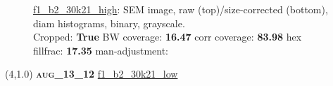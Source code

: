 \begin{figure}[h!]
\label{semimg14}
\caption*{\hyperlink{covtableaug_13_12}{\color{blue} \small \ttfamily f1\_b2\_30k21\_high}: SEM image, raw (top)/size-corrected (bottom), diam histograms, binary, grayscale.\\Cropped: {\bf True} \;\; BW coverage: {\bf 16.47} \:\: corr coverage: {\bf 83.98} \:\: hex fillfrac: {\bf 17.35} \:\: man-adjustment: {\bf \color{blue}{Yes}}}
\end{figure}
\newpage

\begin{textblock}{5}(4,1.0)
{\bf \textsc{aug\_13\_12}}
\hspace{4.5cm}
\hyperlink{covtableaug_13_12}{\color{blue} \large \ttfamily f1\_b2\_30k21\_low}
\end{textblock}

